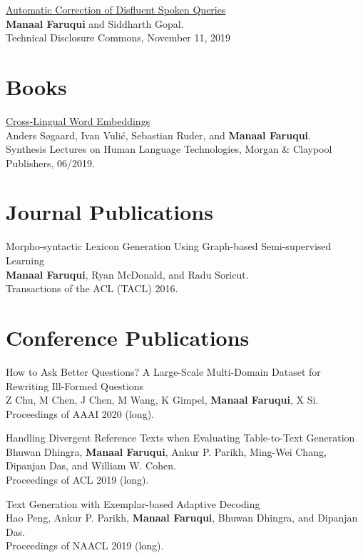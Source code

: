\documentclass[margin,line]{res}
\begin{document}
\begin{resume}
\href{https://www.tdcommons.org/dpubs_series/2661/}{Automatic Correction of Disfluent Spoken Queries}\\
\textbf{Manaal Faruqui} and Siddharth Gopal.\\
Technical Disclosure Commons, November 11, 2019

\section{\sc Books}

\href{https://www.morganclaypool.com/doi/abs/10.2200/S00920ED2V01Y201904HLT042}{Cross-Lingual Word Embeddings}\\
Anders Søgaard, Ivan Vulić, Sebastian Ruder, and \textbf{Manaal Faruqui}.\\
Synthesis Lectures on Human Language Technologies, Morgan \& Claypool Publishers, 06/2019.

\section{\sc Journal Publications}

Morpho-syntactic Lexicon Generation Using Graph-based Semi-supervised Learning\\
\textbf{Manaal Faruqui}, Ryan McDonald, and Radu Soricut.\\
Transactions of the ACL (TACL) 2016.

\vspace{.2cm}
\section{\sc Conference Publications}

How to Ask Better Questions? A Large-Scale Multi-Domain Dataset for Rewriting Ill-Formed Questions\\
Z Chu, M Chen, J Chen, M Wang, K Gimpel, \textbf{Manaal Faruqui}, X Si.\\
Proceedings of AAAI 2020 (long).

Handling Divergent Reference Texts when Evaluating Table-to-Text Generation\\
Bhuwan Dhingra, \textbf{Manaal Faruqui}, Ankur P. Parikh, Ming-Wei Chang, Dipanjan Das, and William W. Cohen.\\
Proceedings of ACL 2019 (long).

Text Generation with Exemplar-based Adaptive Decoding\\
Hao Peng, Ankur P. Parikh, \textbf{Manaal Faruqui}, Bhuwan Dhingra, and Dipanjan Das.\\
Proceedings of NAACL 2019 (long).


\end{resume}
\end{document}
